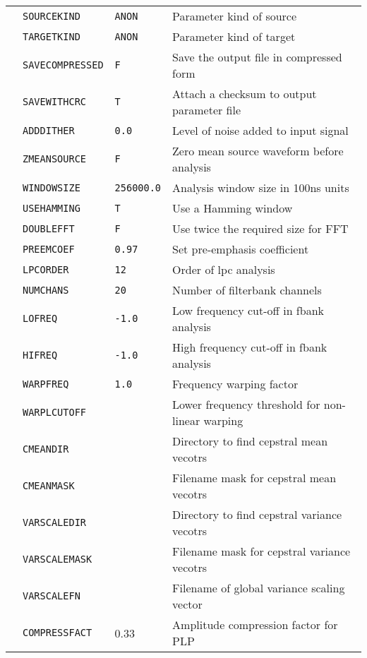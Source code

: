 \begin{center}
\begin{supertabular}{|p{1.4cm}|l|l|p{6.6cm}|}
  & \texttt{SOURCEKIND} & \texttt{ANON} & Parameter kind of source \\ 
  & \texttt{TARGETKIND} & \texttt{ANON} & Parameter kind of target \\ 
  & \texttt{SAVECOMPRESSED} & \texttt{F} & Save the output file in compressed form \\ 
  & \texttt{SAVEWITHCRC} & \texttt{T} & Attach a checksum to output parameter file \\ 
  & \texttt{ADDDITHER} & \texttt{0.0} & Level of noise added to input signal \\  
  & \texttt{ZMEANSOURCE} & \texttt{F} & Zero mean source waveform before analysis \\ 
  & \texttt{WINDOWSIZE} & \texttt{256000.0} & Analysis window size in 100ns units \\ 
  & \texttt{USEHAMMING} & \texttt{T} & Use a Hamming window \\ 
  & \texttt{DOUBLEFFT} & \texttt{F} & Use twice the required size for FFT \\ 
  & \texttt{PREEMCOEF} & \texttt{0.97} & Set pre-emphasis coefficient \\ 
  & \texttt{LPCORDER} &  \texttt{12} &  Order of lpc analysis \\ 
  & \texttt{NUMCHANS} & \texttt{20} & Number of filterbank channels \\ 
  & \texttt{LOFREQ} & \texttt{-1.0} & Low frequency cut-off in fbank analysis \\ 
  & \texttt{HIFREQ}  & \texttt{-1.0} & High frequency cut-off in fbank analysis \\  
  & \texttt{WARPFREQ} & \texttt{1.0} & Frequency warping factor \\ 
  & \texttt{WARPLCUTOFF} &  & Lower frequency threshold for non-linear warping  \\ 

  & \texttt{CMEANDIR} &  & Directory to find cepstral mean vecotrs  \\ 
  & \texttt{CMEANMASK} &  & Filename mask for cepstral mean vecotrs  \\ 
  & \texttt{VARSCALEDIR} &  & Directory to find cepstral variance vecotrs  \\ 
  & \texttt{VARSCALEMASK} &  & Filename mask for cepstral variance vecotrs  \\ 
  & \texttt{VARSCALEFN} &  & Filename of global variance scaling vector \\ 
  & \texttt{COMPRESSFACT} & 0.33 & Amplitude compression factor for PLP \\ \hline


\end{supertabular}
\end{center}
